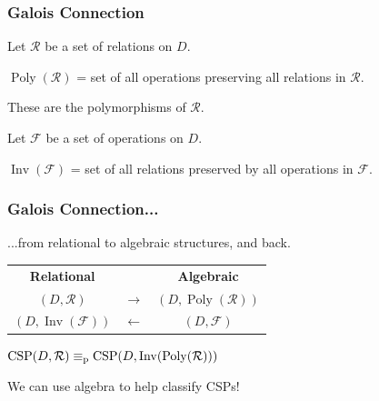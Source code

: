 \documentclass[10pt,xcolor=dvipsnames%
   ]{beamer}
\DeclareMathOperator{\Rel}{Rel}
\newcommand{\bigpause}{\pause\bigskip}
\DeclareMathOperator{\CSP}{CSP}
\DeclareMathOperator{\Poly}{Poly}
\DeclareMathOperator{\Inv}{Inv}
\renewcommand{\.}{\cdot}
\newcommand{\sS}{\ensuremath{\mathcal{S}}}
\newcommand{\sR}{\ensuremath{\mathcal{R}}}
\newcommand{\sF}{\ensuremath{\mathcal{F}}}
\newcommand{\reduc}{\leq_{\text{\textnormal{p}}}}
\newcommand{\equivp}{\equiv_{\text{\textnormal{p}}}}
\let\origtextbf=\textbf
\begin{document}
\begin{frame}
  \frametitle{Galois Connection}

    Let $\sR$ be a set of relations on $D$.

    \bigskip
    \emph{$\Poly(\sR)$}  = set of all operations preserving
    all relations in $\sR$. 

    \bigskip
    These are the \alert{polymorphisms} of  $\sR$. 

    \bigskip

    Let $\sF$ be a set of operations on $D$. 

    \bigskip
    \emph{$\Inv(\sF)$} = set of all relations preserved by all operations in $\sF$.
  

\end{frame}

\begin{frame}
\frametitle{Galois Connection...}
  ...from relational to algebraic structures, and back.

  \begin{center}
    \begin{tabular}{ccc}
      \origtextbf{Relational} & &\origtextbf{Algebraic}  \\
      $(D,\sR)$ & $\longrightarrow$ & $(D,\Poly(\sR))$ \\[2pt]
      $(D, \Inv(\sF))$ & $\longleftarrow$ &$(D,\sF)$
    \end{tabular}
  \end{center}

  $\CSP(D,\sR) \equivp \CSP(D,\Inv(\Poly(\sR)))$

  We can use algebra to help classify CSPs!

  \end{frame}
\end{document}
